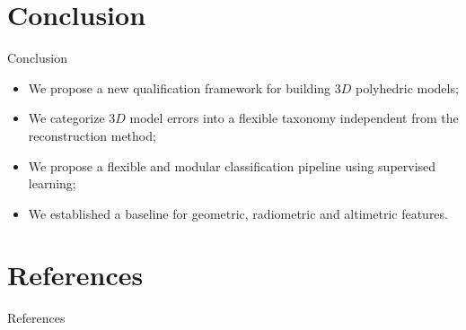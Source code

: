 \documentclass{beamer}
\begin{document}
    \section{Conclusion}
        \begin{frame}{Conclusion}
            \begin{itemize}
                \item We propose a new qualification framework for building $3D$ polyhedric models;
                \item We categorize $3D$ model errors into a flexible taxonomy independent from the reconstruction method;
                \item We propose a flexible and modular classification pipeline using supervised learning;
                \item We established a baseline for geometric, radiometric and altimetric features.
            \end{itemize}
        \end{frame}
    \section*{References}
        \begin{frame}[allowframebreaks]{References}
            \printbibliography
        \end{frame}
\end{document}
